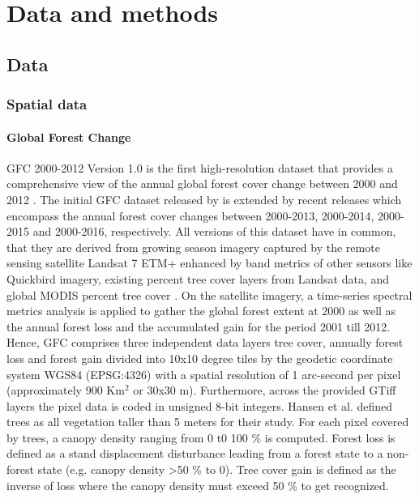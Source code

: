 \chapter{Data and methods}
\label{ch:datamethods}
\section{Data}
\label{sec:data}
	\subsection{Spatial data}
		\subsubsection{Global Forest Change}
			\ac{GFC} 2000-2012 Version 1.0 is the first high-resolution dataset that provides a comprehensive view of the annual global forest cover change between 2000 and 2012 \citep{Hansen2013, Li2017}. The initial \ac{GFC} dataset released by \citeauthor{Hansen2013} is extended by recent releases which encompass the annual forest cover changes between 2000-2013, 2000-2014, 2000-2015 and 2000-2016, respectively. All versions of this dataset have in common, that they are derived from growing season imagery captured by the remote sensing satellite Landsat 7 \ac{ETM+} enhanced by band metrics of other sensors like Quickbird imagery, existing percent tree cover layers from Landsat data, and global \ac{MODIS} percent tree cover \citep{Hansen2013}. On the satellite imagery, a time-series spectral metrics analysis is applied to gather the global forest extent at 2000 as well as the annual forest loss and the accumulated gain for the period 2001 till 2012. Hence, \ac{GFC} comprises three independent data layers tree cover, annually forest loss and forest gain divided into 10x10 degree tiles by the geodetic coordinate system \ac{WGS84} (EPSG:4326) with a spatial resolution of 1 arc-second per pixel (approximately 900 Km$^2$ or 30x30 m). Furthermore, across the provided \ac{GTiff} layers the pixel data is coded in unsigned 8-bit integers. Hansen et al. defined trees as all vegetation taller than 5 meters for their study. For each pixel covered by trees, a canopy density ranging from 0 t0 100 \% is computed. Forest loss is defined as a stand displacement disturbance leading from a forest state to a non-forest state (e.g. canopy density >50 \% to 0). Tree cover gain is defined as the inverse of loss where the canopy density must exceed 50 \% to get recognized.

